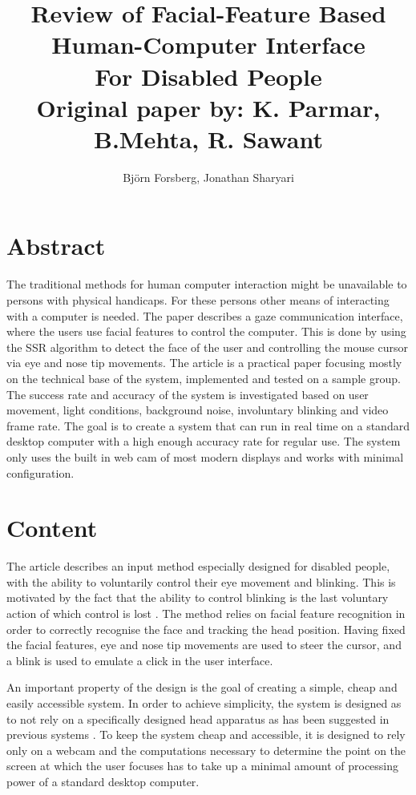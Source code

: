 \documentclass[a4paper,10pt]{article}
\title{Review of Facial-Feature Based \\
	Human-Computer Interface \\
	For Disabled People \\
	\vspace{3mm} \normalsize Original paper by: K. Parmar, B.Mehta, R. Sawant}
\author{Bj{\"o}rn Forsberg, Jonathan Sharyari}
\begin{document}
\maketitle


\section{Abstract}

The traditional methods for human computer interaction might be unavailable to persons with physical handicaps. For these persons other means of interacting with a computer is needed. The paper describes a gaze communication interface, where the users use facial features to control the computer. This is done by using the SSR algorithm to detect the face of the user and controlling the mouse cursor via eye and nose tip movements. The article is a practical paper focusing mostly on the technical base of the system,  implemented and tested on a sample group. The success rate and accuracy of the system is investigated based on user movement, light conditions, background noise, involuntary blinking and video frame rate.
The goal is to create a system that can run in real time on a standard desktop computer with a high enough accuracy rate for regular use. The system only uses the built in web cam of most modern displays and works with minimal configuration.

\section{Content}
The article describes an input method especially designed for disabled people, with the ability to voluntarily control their eye movement and blinking. This is motivated by the fact that the ability to control blinking is the last voluntary action of which control is lost \cite{voluntaryblink}. The method relies on facial feature recognition in order to correctly recognise the face and tracking the head position. Having fixed the facial features, eye and nose tip movements are used to steer the cursor, and a blink is used to emulate a click in the user interface.

An important property of the design is the goal of creating a simple, cheap and easily accessible system. In order to achieve simplicity, the system is designed as to not rely on a specifically designed head apparatus as has been suggested in previous systems \cite{goggles1} \cite{goggles2}. To keep the system cheap and accessible, it is designed to rely only on a webcam and the computations necessary to determine the point on the screen at which the user focuses has to take up a minimal amount of processing power of a standard desktop computer. 
\end{document}
